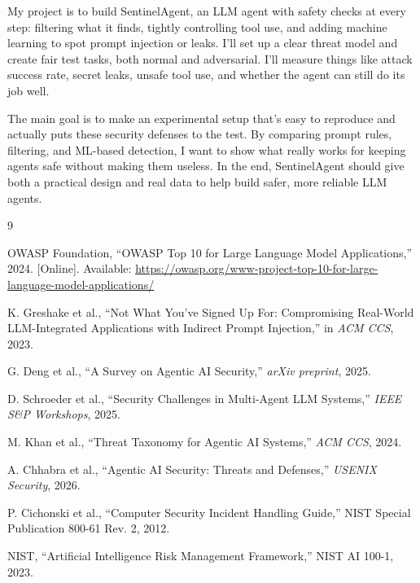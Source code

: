 \documentclass[11pt]{article}
\begin{document}
My project is to build SentinelAgent, an LLM agent with safety checks at every step: filtering what it finds, tightly controlling tool use, and adding machine learning to spot prompt injection or leaks. I'll set up a clear threat model and create fair test tasks, both normal and adversarial. I'll measure things like attack success rate, secret leaks, unsafe tool use, and whether the agent can still do its job well.

The main goal is to make an experimental setup that's easy to reproduce and actually puts these security defenses to the test. By comparing prompt rules, filtering, and ML-based detection, I want to show what really works for keeping agents safe without making them useless. In the end, SentinelAgent should give both a practical design and real data to help build safer, more reliable LLM agents.
\begin{thebibliography}{9}

OWASP Foundation, ``OWASP Top 10 for Large Language Model Applications,'' 2024. [Online]. Available: \url{https://owasp.org/www-project-top-10-for-large-language-model-applications/}

K. Greshake et al., ``Not What You've Signed Up For: Compromising Real-World LLM-Integrated Applications with Indirect Prompt Injection,'' in \textit{ACM CCS}, 2023.

G. Deng et al., ``A Survey on Agentic AI Security,'' \textit{arXiv preprint}, 2025.

D. Schroeder et al., ``Security Challenges in Multi-Agent LLM Systems,'' \textit{IEEE S\&P Workshops}, 2025.

M. Khan et al., ``Threat Taxonomy for Agentic AI Systems,'' \textit{ACM CCS}, 2024.

A. Chhabra et al., ``Agentic AI Security: Threats and Defenses,'' \textit{USENIX Security}, 2026.

P. Cichonski et al., ``Computer Security Incident Handling Guide,'' NIST Special Publication 800-61 Rev. 2, 2012.

NIST, ``Artificial Intelligence Risk Management Framework,'' NIST AI 100-1, 2023.

\end{thebibliography}
\end{document}
